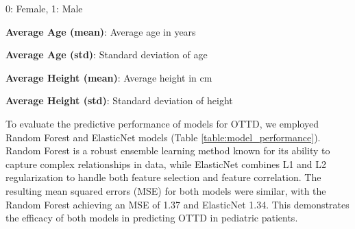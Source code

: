 \documentclass[11pt]{article}
\begin{document}
\begin{table}[h]
\caption{Descriptive statistics of height and age stratified by sex}
\label{table:age_height_by_sex}
\begin{threeparttable}
\renewcommand{\TPTminimum}{\linewidth}
\begin{tablenotes}
\footnotesize
\item 0: Female, 1: Male
\item \textbf{Average Age (mean)}: Average age in years
\item \textbf{Average Age (std)}: Standard deviation of age
\item \textbf{Average Height (mean)}: Average height in cm
\item \textbf{Average Height (std)}: Standard deviation of height
\end{tablenotes}
\end{threeparttable}
\end{table}


To evaluate the predictive performance of models for OTTD, we employed Random Forest and ElasticNet models (Table {}\ref{table:model_performance}). Random Forest is a robust ensemble learning method known for its ability to capture complex relationships in data, while ElasticNet combines L1 and L2 regularization to handle both feature selection and feature correlation. The resulting mean squared errors (MSE) for both models were similar, with the Random Forest achieving an MSE of 1.37 and ElasticNet 1.34. This demonstrates the efficacy of both models in predicting OTTD in pediatric patients.
\end{document}
